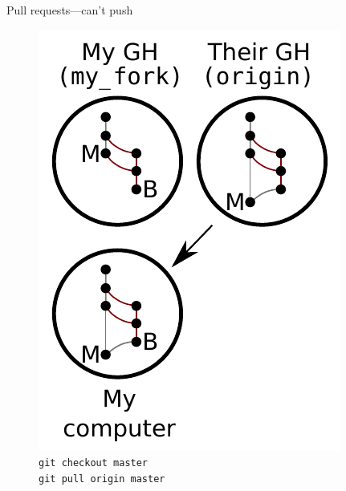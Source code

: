 \begin{frame}{Pull requests---can't push}
  \begin{figure}
    \includegraphics{fork_015.pdf}
    \\ \texttt{git checkout master}
    \\ \texttt{git pull origin master}
  \end{figure}
\end{frame}

